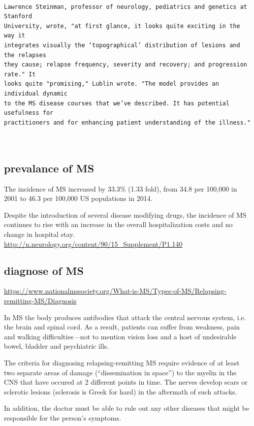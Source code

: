 \begin{verbatim}

Lawrence Steinman, professor of neurology, pediatrics and genetics at Stanford
University, wrote, "at first glance, it looks quite exciting in the way it
integrates visually the ‘topographical’ distribution of lesions and the relapses
they cause; relapse frequency, severity and recovery; and progression rate." It
looks quite "promising," Lublin wrote. "The model provides an individual dynamic
to the MS disease courses that we’ve described. It has potential usefulness for
practitioners and for enhancing patient understanding of the illness."



\end{verbatim}

\subsection{prevalance of MS}

The incidence of MS increased by 33.3\% (1.33 fold), from 34.8 per 100,000 in 2001 to 46.3 per 100,000 US populations in 2014. 


 Despite the introduction of several disease modifying drugs, the incidence of
 MS continues to rise with an increase in the overall hospitalization costs and
 no change in hospital stay.
\url{http://n.neurology.org/content/90/15_Supplement/P1.140}

\subsection{diagnose of MS}

\url{https://www.nationalmssociety.org/What-is-MS/Types-of-MS/Relapsing-remitting-MS/Diagnosis}

In MS the body produces antibodies that attack the central nervous system, i.e.
the brain and spinal cord. As a result, patients can suffer from weakness, pain
and walking difficulties—not to mention vision loss and a host of undesirable
bowel, bladder and psychiatric ills.

The criteria for diagnosing relapsing-remitting MS require evidence of at least
two separate areas of damage (“dissemination in space”) to the myelin in the CNS
that have occured at 2 different points in time. The nerves develop scars or
sclerotic lesions (sclerosis is Greek for hard) in the aftermath of such
attacks.

In addition, the doctor must be able to rule out any other diseases that might
be responsible for the person’s symptoms.

